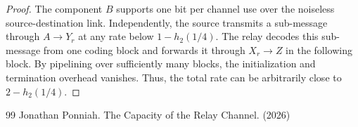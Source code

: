 \documentclass[10pt,a4paper]{amsart}
\begin{document}
\begin{proof}
The component $B$ supports one bit per channel use over the noiseless source-destination link. Independently, the source transmits a sub-message through $A \to Y_r$ at any rate below $1 - h_2(1/4)$. The relay decodes this sub-message from one coding block and forwards it through $X_r \to Z$ in the following block. By pipelining over sufficiently many blocks, the initialization and termination overhead vanishes. Thus, the total rate can be arbitrarily close to $2 - h_2(1/4)$.
\end{proof}

\begin{thebibliography}{99}
 Jonathan Ponniah. The Capacity of the Relay Channel. (2026)
\end{thebibliography}
\end{document}
